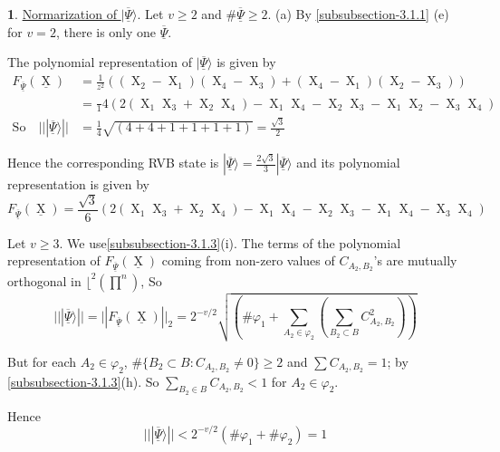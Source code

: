 \documentclass[a4paper,12pt]{article}
\DeclareMathOperator{\x}{\mathrm{X}}
\theoremstyle{definition}
\theoremstyle{underlinethm}
\theoremstyle{underline}
\newtheorem{subsubsec}{}[subsection]
\begin{document}
\begin{subsubsec}\label{subsubsection-3.1.4}
\underline{Normarization of $| \underline{\overline{\Psi}} \rangle$}. Let $v \geq 2$ and $\# \underline{\overline{\Psi}} \geq 2 $. (a) By \ref{subsubsection-3.1.1} (e) for $v=2$, there is only one $\underline{\overline{\Psi}}$. 

The polynomial representation of $| \underline{\overline{\Psi}} \rangle$ is given by
\begin{align*}
F_{\underline{\overline{\Psi}}} (\underline{\x}) &= \frac{1}{z^{2}}\left((\x_{2} - \x_{1}) (\x_{4} - \x_{3}) + (\x_{4}-\x_{1}) (\x_{2}-\x_{3})\right)\\
 &= \frac{}1{4} \left(2(\x_{1} \x_{3} + \x_{2} \x_{4}) - \x_{1} \x_{4}- \x_{2}\x_{3} -\x_{1}\x_{2}-\x_{3}\x_{4}\right)\\
\text{So} \quad || | \underline{\overline{\Psi}} \rangle || &= \frac{1}{4} \sqrt{\left(4+4+1+1+1+1\right)} = \frac{\sqrt{3}}{2}\tag{3.13}
\end{align*}

Hence the corresponding RVB state is $| \underline{\overline{\Psi}} \rangle  = \frac{2\sqrt{3}}{3} | \underline{\overline{\Psi}} \rangle$ and its polynomial representation is given by 
\begin{equation*}
F_{\underline{\overline{\Psi}}}(\underline{\x}) = \frac{\sqrt{3}}{6} \left(2(\x_{1}\x_{3} + \x_{2}\x_{4}) - \x_{1}\x_{4} - \x_{2}\x_{3}- \x_{1}\x_{4} -\x_{3}\x_{4}\right)\tag{3.14}
\end{equation*}

Let $v\geq 3$. We use\ref{subsubsection-3.1.3}(i). The terms of the polynomial representation of $F_{\underline{\overline{\Psi}}}(\underline{\x})$ coming from non-zero values of $C_{A_{2}, B_{2}}$'s are mutually orthogonal in $\lfloor^{2}\left(\prod^{n}\right)$, So
\begin{equation*}
|| | \underline{\overline{\Psi}} \rangle || = ||F_{\underline{\overline{\Psi}}}(\underline{\x})||_{2} = 2^{-v/2}\sqrt{\left(\# \varphi_{1}  + \sum_{A_{2} \in \varphi_{2}} \left(\sum_{B_{2} \subset B} C_{A_{2}, B_{2}}^{2}\right) \right)}\tag{3.15}
\end{equation*}

But for each $A_{2} \in \varphi_{2}$, $\# \{B_{2} \subset B  : C_{A_{2}, B_{2}} \neq 0\} \geq 2$ and $\sum C_{A_{2}, B_{2}} = 1$; by \ref{subsubsection-3.1.3}(h). So $\sum_{B_{2} \in B} C_{A_{2}, B_{2}} < 1$ for $A_{2} \in \varphi_{2}$.

Hence
\begin{equation*}
|| | \underline{\overline{\Psi}} \rangle || < 2^{-v/2} (\# \varphi_{1} + \# \varphi_{2}) =1\tag{3.16}
\end{equation*}


\end{subsubsec}
\end{document}

